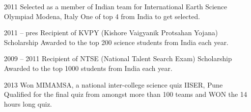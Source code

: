 \documentclass[11pt,print]{friggeri-cv}%
\begin{document}
\begin{entrylist}
  \entryy
    {2011}
    {Selected as a member of Indian team for International Earth Science Olympiad}
    {Modena, Italy}
    {One of top 4 from India to get selected.}
\end{entrylist}
\begin{entrylist}
  \entryy
    {2011 -- pres}
    {Recipient of KVPY (Kishore Vaigyanik Protsahan Yojana) Scholarship}{}
    {Awarded to the top 200 science students from India each year.}

\end{entrylist}
\begin{entrylist}
  \entryy
    {2009 -- 2011}
    {Recipient of NTSE (National Talent Search Exam) Scholarship}{}
    {Awarded to the top 1000 students from India each year.}
\end{entrylist}
\begin{entrylist}
  \entryy
    {2013}
    {Won MIMAMSA, a national inter-college science quiz}
    {IISER, Pune}
    {Qualified for the final quiz from amongst more than 100 teams and WON the 14 hours long quiz.}
\end{entrylist}
\end{document}
